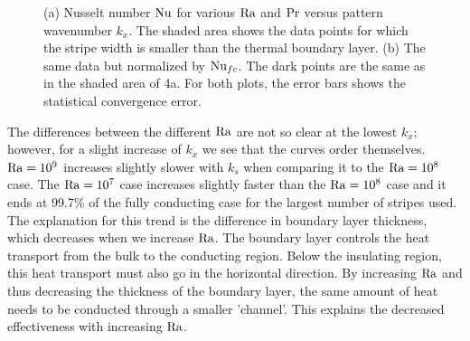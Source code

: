 \begin{figure}
\centering
{}
\caption{%
(a) Nusselt number $\text{Nu}$ for various $\text{Ra}$
and $\text{Pr}$ versus pattern wavenumber $k_x$. The shaded area shows the
data points for which the stripe width is smaller than the thermal
boundary layer. (b) The same data but normalized by $\text{Nu}_{fc}$. The dark
points are the same as in the shaded area of 4a. For both plots, the error
bars shows the statistical convergence error.}
\label{figure3}
\end{figure}

The differences between the different $\text{Ra}$ are not so clear at the lowest
$k_x$; however, for a slight increase of $k_x$ we see that the curves order
themselves.  $\text{Ra} = 10^9$ increases slightly slower with $k_s$ when comparing
it to the $\text{Ra} = 10^8$ case.  The $\text{Ra} = 10^7$ case increases slightly
faster than the $\text{Ra} = 10^8$ case and it ends at 99.7\% of the fully
conducting case for the largest number of stripes used.  The explanation for
this trend is the difference in boundary layer thickness, which decreases when
we increase $\text{Ra}$.  The boundary layer controls the heat transport from the
bulk to the conducting region.  Below the insulating region, this heat
transport must also go in the horizontal direction.  By increasing $\text{Ra}$ and
thus decreasing the thickness of the boundary layer, the same amount of heat
needs to be conducted through a smaller 'channel'.  This explains the
decreased effectiveness with increasing $\text{Ra}$.

